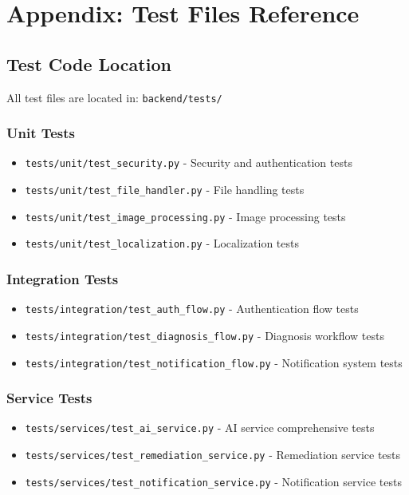 \documentclass[12pt,a4paper]{article}
\begin{document}
\section*{Appendix: Test Files Reference}

\subsection*{Test Code Location}

All test files are located in: \texttt{backend/tests/}

\subsubsection*{Unit Tests}
\begin{itemize}
    \item \texttt{tests/unit/test\_security.py} - Security and authentication tests
    \item \texttt{tests/unit/test\_file\_handler.py} - File handling tests
    \item \texttt{tests/unit/test\_image\_processing.py} - Image processing tests
    \item \texttt{tests/unit/test\_localization.py} - Localization tests
\end{itemize}

\subsubsection*{Integration Tests}
\begin{itemize}
    \item \texttt{tests/integration/test\_auth\_flow.py} - Authentication flow tests
    \item \texttt{tests/integration/test\_diagnosis\_flow.py} - Diagnosis workflow tests
    \item \texttt{tests/integration/test\_notification\_flow.py} - Notification system tests
\end{itemize}

\subsubsection*{Service Tests}
\begin{itemize}
    \item \texttt{tests/services/test\_ai\_service.py} - AI service comprehensive tests
    \item \texttt{tests/services/test\_remediation\_service.py} - Remediation service tests
    \item \texttt{tests/services/test\_notification\_service.py} - Notification service tests
\end{itemize}
\end{document}
